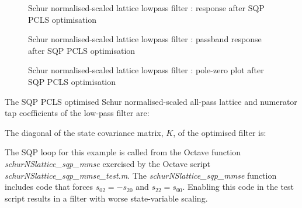 \documentclass[a4paper,twoside,10pt,english]{report}
\begin{document}
\begin{figure}[!htbp]
\begin{center}
\scalebox{0.7}{}
\caption{Schur normalised-scaled lattice lowpass filter : response after SQP PCLS optimisation}
\label{fig:Schur-normalised-scaled-lattice-lowpass-filter-SQP-PCLS}
\end{center}
\end{figure}
\begin{figure}[!htbp]
\begin{center}
\scalebox{0.7}{}
\caption{Schur normalised-scaled lattice lowpass filter : passband response after SQP PCLS optimisation}
\label{fig:Schur-normalised-scaled-lattice-lowpass-filter-SQP-PCLS-pass}
\end{center}
\end{figure}
\begin{figure}[!htbp]
\begin{center}
\scalebox{0.7}{}
\caption{Schur normalised-scaled lattice lowpass filter : pole-zero plot after SQP PCLS optimisation}
\label{fig:Schur-normalised-scaled-lattice-lowpass-filter-SQP-PCLS-pz}
\end{center}
\end{figure}

The SQP PCLS optimised Schur normalised-scaled all-pass lattice and numerator 
tap coefficients of the low-pass filter are:
\begin{small}






\end{small}

The diagonal of the state covariance matrix, $K$, of the optimised filter is:
\begin{small}

\end{small}

The SQP loop for this example is called from the Octave
function \emph{schurNSlattice\_sqp\_mmse} exercised by the 
Octave script \emph{schurNSlattice\_sqp\_mmse\_test.m}. 
The \emph{schurNSlattice\_sqp\_mmse} function includes code that forces 
$s_{02}=-s_{20}$ and $s_{22}=s_{00}$. Enabling this code in the test script
results in a filter with worse state-variable scaling.
\clearpage
\end{document}
